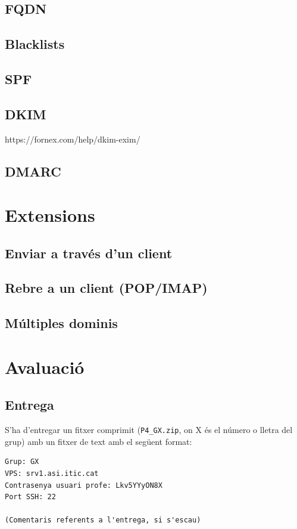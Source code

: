 \documentclass{practicaitic}
\begin{document}
\subsection{FQDN}
\subsection{Blacklists}
\subsection{SPF}
\subsection{DKIM}
https://fornex.com/help/dkim-exim/
\subsection{DMARC}

\section{Extensions}
\subsection{Enviar a través d'un client}
\subsection{Rebre a un client (POP/IMAP)}
\subsection{Múltiples dominis}

\section{Avaluació}
\subsection{Entrega}
\label{sec:entrega}

S'ha d'entregar un fitxer comprimit (\texttt{P4\_GX.zip}, on X és el número o 
lletra del grup) amb un fitxer de text amb el següent format:

\begin{verbatim}
Grup: GX
VPS: srv1.asi.itic.cat
Contrasenya usuari profe: Lkv5YYyON8X
Port SSH: 22

(Comentaris referents a l'entrega, si s'escau)
\end{verbatim}
\end{document}
